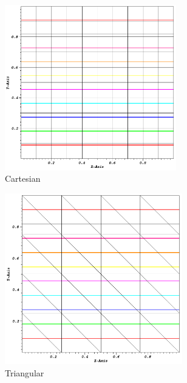 \begin{figure}
\centering
	\begin{subfigure}[b]{0.5\textwidth}
		\centering
		\includegraphics[width=0.82\textwidth]{figures/sec_DSA/SIP_cart_lin_contour.png}
		\caption{Cartesian}
	\end{subfigure}
	\vfill
	\begin{subfigure}[b]{0.45\textwidth}
		\centering
		\includegraphics[width=0.85\textwidth]{figures/sec_DSA/SIP_tri_lin_contour.png}
		\caption{Triangular}
	\end{subfigure}
	\hfill
	\begin{subfigure}[b]{0.45\textwidth}

\end{subfigure}
\end{figure}
